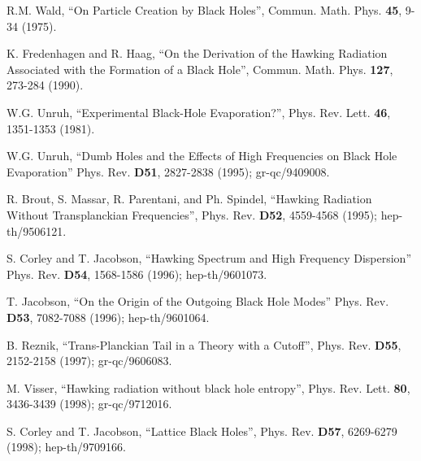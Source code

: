 \documentclass[12pt]{article}
\newcommand{\comment}[1]{}
\newcommand{\keywords}[1]{}
\begin{document}
\begin{thebibliography}{999}
\comment{article} R.M. Wald, ``On Particle Creation by
Black Holes'', Commun. Math. Phys. {\bf 45}, 9-34 (1975).
\keywords{black hole thermodynamics, black holes, quantum field theory
in curved spacetime}

\comment{article} K. Fredenhagen and R. Haag, ``On the
Derivation of the Hawking Radiation Associated with the Formation of a
Black Hole'', Commun. Math. Phys. {\bf 127}, 273-284 (1990).
\keywords{black holes, quantum field theory in curved spacetime}

\comment{article} W.G. Unruh, ``Experimental Black-Hole
Evaporation?'', Phys. Rev. Lett. {\bf 46}, 1351-1353 (1981).
\keywords{black holes, quantum field theory in curved spacetime}

\comment{article} W.G. Unruh, ``Dumb Holes and the Effects
of High Frequencies on Black Hole Evaporation'' Phys. Rev. {\bf D51},
2827-2838 (1995); gr-qc/9409008.  
\keywords{black holes, quantum field theory in curved spacetime}

\comment{article} R. Brout, S. Massar, R. Parentani, and
Ph. Spindel, ``Hawking Radiation Without Transplanckian Frequencies'',
Phys. Rev. {\bf D52}, 4559-4568 (1995); hep-th/9506121.
\keywords{black holes, quantum field theory in curved spacetime}

\comment{article} S. Corley and T. Jacobson, ``Hawking
Spectrum and High Frequency Dispersion'' Phys. Rev. {\bf D54},
1568-1586 (1996); hep-th/9601073.  \keywords{black holes, quantum
field theory in curved spacetime}

\comment{article} T. Jacobson, ``On the Origin of the
Outgoing Black Hole Modes'' Phys. Rev. {\bf D53}, 7082-7088 (1996);
hep-th/9601064.  \keywords{black holes, quantum field theory in curved
spacetime}

\comment{article} B. Reznik, ``Trans-Planckian Tail in a
Theory with a Cutoff'', Phys. Rev. {\bf D55}, 2152-2158 (1997);
gr-qc/9606083.  \keywords{black holes, quantum field theory in curved
spacetime}

\comment{article} M. Visser, ``Hawking radiation without
black hole entropy'', Phys. Rev. Lett. {\bf 80}, 3436-3439 (1998);
gr-qc/9712016.  \keywords{black holes, quantum field theory in curved
spacetime}

\comment{article} S. Corley and T. Jacobson, ``Lattice
Black Holes'', Phys. Rev. {\bf D57}, 6269-6279 (1998); hep-th/9709166.
\keywords{black holes, quantum field theory in curved spacetime}


\end{thebibliography}
\end{document}
